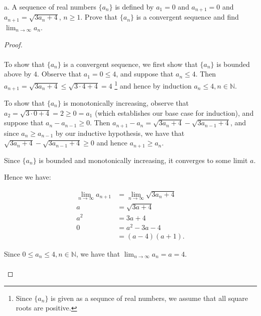 a.  A sequence of real numbers $\{a_n\}$ is defined by $a_1 = 0$ and
    $a_{n+1} = 0$ and $a_{n+1} = \sqrt{3a_n + 4}$, $n \ge 1$. Prove that
    $\{a_n\}$ is a convergent sequence and find
    $\lim_{n \rightarrow \infty}{a_n}$.

    \begin{proof}\ \\\\

        To show that $\{a_n\}$ is a convergent sequence, we first show that
        $\{a_n\}$ is bounded above by $4$. Observe that
        $a_1 = 0 \le 4$, and suppose that $a_n \le 4$. Then
        $a_{n+1} = \sqrt{3a_n + 4} \le \sqrt{3 \cdot 4 + 4} = 4$
        {\footnote{Since $\{a_n\}$ is given as a sequnce of real numbers,
                   we assume that all square roots are positive.}} and hence by
        induction $a_{n} \le 4, n \in \mathbb{N}$.

        To show that $\{a_n\}$ is monotonically increasing, observe that
        $a_2 = \sqrt{3 \cdot 0 + 4} = 2 \ge 0 = a_1$ (which establishes our 
        base case for induction), and suppose that
        $a_n - a_{n-1} \ge 0$. Then 
        $a_{n+1} - a_n = \sqrt{3a_n + 4} - \sqrt {3a_{n-1} + 4}$, and since
        $a_n \ge a_{n-1}$ by our inductive hypothesis, we have that 
        $\sqrt{3a_n + 4} - \sqrt {3a_{n-1} + 4} \ge 0$ and hence
        $a_{n+1} \ge a_n$.

        Since $\{a_n\}$ is bounded and monotonically increasing, it converges to
        some limit $a$.

        Hence we have:

        \begin{align*}
            \lim_{n \rightarrow \infty}{a_{n+1}} &= \lim_{n \rightarrow \infty}{\sqrt{3a_n + 4}} \\
                                               a &= \sqrt{3a + 4} \\
                                             a^2 &= 3a + 4 \\
                                               0 &= a^2 - 3a - 4 \\
                                                 &= (a - 4)(a + 1).
        \end{align*}

        Since $0 \le a_n \le 4, n \in \mathbb{N}$, we have that 
        $\lim_{n \rightarrow \infty}{a_n} = a = 4$.
        \\\\
    \end{proof}
    \pagebreak

